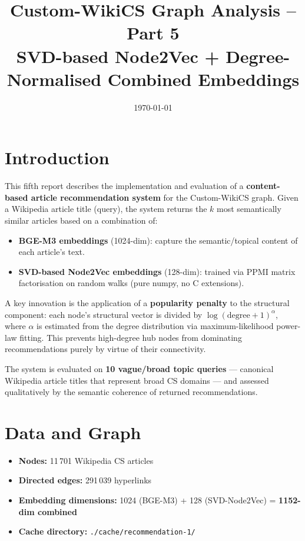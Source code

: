 \documentclass[12pt,a4paper]{article}
\title{Custom-WikiCS Graph Analysis -- Part 5\\[4pt]
\large SVD-based Node2Vec + Degree-Normalised Combined Embeddings}
\author{}
\date{\today}
\begin{document}
\maketitle

\section{Introduction}

This fifth report describes the implementation and evaluation of a
\textbf{content-based article recommendation system} for the Custom-WikiCS
graph.  Given a Wikipedia article title (query), the system returns the $k$
most semantically similar articles based on a combination of:

\begin{itemize}
    \item \textbf{BGE-M3 embeddings} (1024-dim): capture the semantic/topical
          content of each article's text.
    \item \textbf{SVD-based Node2Vec embeddings} (128-dim): trained via PPMI
          matrix factorisation on random walks (pure numpy, no C extensions).
\end{itemize}

A key innovation is the application of a \textbf{popularity penalty} to the
structural component: each node's structural vector is divided by
$\log(\text{degree}+1)^{\alpha}$, where $\alpha$ is estimated from the
degree distribution via maximum-likelihood power-law fitting.  This prevents
high-degree hub nodes from dominating recommendations purely by virtue of
their connectivity.

The system is evaluated on \textbf{10 vague/broad topic queries} ---
canonical Wikipedia article titles that represent broad CS domains ---
and assessed qualitatively by the semantic coherence of returned recommendations.

\section{Data and Graph}

\begin{itemize}
    \item \textbf{Nodes:} 11\,701 Wikipedia CS articles
    \item \textbf{Directed edges:} 291\,039 hyperlinks
    \item \textbf{Embedding dimensions:} 1024 (BGE-M3) + 128 (SVD-Node2Vec) = \textbf{1152-dim combined}
    \item \textbf{Cache directory:} \texttt{./cache/recommendation-1/}
\end{itemize}
\end{document}
